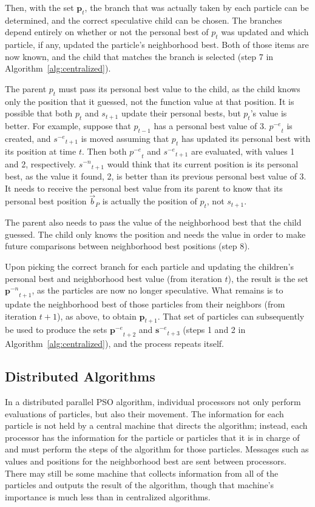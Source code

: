 \documentclass[journal,letterpaper]{IEEEtran}
\newcommand{\alg}[1]{Algorithm~\ref{alg:#1}}
\providecommand{\pbest}{\ensuremath{\Vec{b}_P}}
\providecommand{\noeval}[1]{\ensuremath{#1^{-e}}}
\providecommand{\nonbest}[1]{\ensuremath{#1^{-n}}}
\providecommand{\p}{\ensuremath{p}}
\providecommand{\pset}{\ensuremath{\mathbf{p}}}
\providecommand{\s}{\ensuremath{s}}
\providecommand{\sset}{\ensuremath{\mathbf{s}}}
\begin{document}
Then, with the set $\pset_t$, the branch that was actually taken by each
particle can be determined, and the correct speculative child can be chosen.
The branches depend entirely on whether or not the personal best of $p_t$ was
updated and which particle, if any, updated the particle's neighborhood best.
Both of those items are now known, and the child that matches the branch is
selected (step 7 in \alg{centralized}).

The parent $\p_t$ must pass its personal best value to the child, as the child
knows only the position that it guessed, not the function value at that
position.  It is possible that both $\p_t$ and $\s_{t+1}$ update their
personal bests, but $\p_t$'s value is better.  For example, suppose that
$\p_{t-1}$ has a personal best value of 3.  $\noeval{\p}_t$ is created, and
$\noeval{\s}_{t+1}$ is moved assuming that $\p_t$ has updated its personal
best with its position at time $t$.  Then both $\noeval{\p}_t$ and
$\noeval{\s}_{t+1}$ are evaluated, with values 1 and 2, respectively.
$\nonbest{\s}_{t+1}$ would think that its current position is its personal
best, as the value it found, 2, is better than its previous personal best
value of 3.  It needs to receive the personal best value from its parent to
know that its personal best position $\pbest$ is actually the position of
$\p_t$, not $\s_{t+1}$.

The parent also needs to pass the value of the neighborhood best that the child
guessed.  The child only knows the position and needs the value in order to
make future comparisons between neighborhood best positions (step 8).

Upon picking the correct branch for each particle and updating the children's
personal best and neighborhood best value (from iteration $t$), the result is
the set $\nonbest{\pset}_{t+1}$, as the particles are now no longer
speculative.  What remains is to update the neighborhood best of those
particles from their neighbors (from iteration $t+1$), as above, to obtain
$\pset_{t+1}$.  That set of particles can subsequently be used to produce the
sets $\noeval{\pset}_{t+2}$ and $\noeval{\sset}_{t+3}$ (steps 1 and 2 in
\alg{centralized}), and the process repeats itself.

\subsection{Distributed Algorithms}

\label{sec:distributed}

In a distributed parallel PSO algorithm, individual processors not only perform
evaluations of particles, but also their movement.  The information for each
particle is not held by a central machine that directs the algorithm; instead,
each processor has the information for the particle or particles that it is in
charge of and must perform the steps of the algorithm for those particles.
Messages such as values and positions for the neighborhood best are sent
between processors.  There may still be some machine that collects information
from all of the particles and outputs the result of the algorithm, though that
machine's importance is much less than in centralized algorithms.
\end{document}
